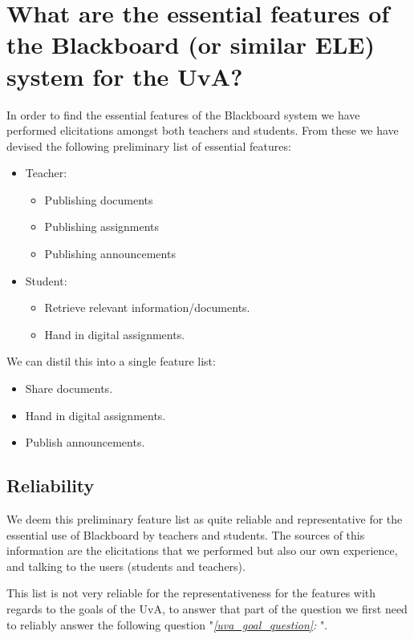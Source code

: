 \section{What are the essential features of the Blackboard (or similar ELE) system for the UvA?}
In order to find the essential features of the Blackboard system we have performed elicitations amongst both teachers and students. From these we have devised the following preliminary list of essential features:

\begin{itemize}
	\item Teacher:
	\begin{itemize}
		\item Publishing documents
		\item Publishing assignments
		\item Publishing announcements
	\end{itemize}

	\item Student:
	\begin{itemize}
		\item Retrieve relevant information/documents.
		\item Hand in digital assignments.
	\end{itemize}
\end{itemize}

We can distil this into a single feature list:
\begin{itemize}
	\item Share documents.
	\item Hand in digital assignments.
	\item Publish announcements.
\end{itemize}

\subsection{Reliability}
We deem this preliminary feature list as quite reliable and representative for the essential use of Blackboard by teachers and students. The sources of this information are the elicitations that we performed but also our own experience, and talking to the users (students and teachers).

This list is not very reliable for the representativeness for the features with regards to the goals of the UvA, to answer that part of the question we first need to reliably answer the following question "\emph{\ref{uva_goal_question}: }".


